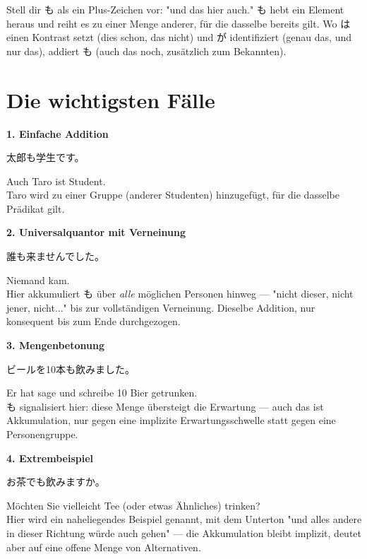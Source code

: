 \documentclass[12pt]{book}
\begin{document}
Stell dir も als ein Plus-Zeichen vor: "und das hier auch." も hebt ein Element heraus und reiht es zu einer Menge anderer, für die dasselbe bereits gilt. Wo は einen Kontrast setzt (dies schon, das nicht) und が identifiziert (genau das, und nur das), addiert も (auch das noch, zusätzlich zum Bekannten).

\section*{Die wichtigsten Fälle}

\textbf{1. Einfache Addition}
\par\quad 太郎も学生です。\\
\par\quad Auch Taro ist Student.\\

Taro wird zu einer Gruppe (anderer Studenten) hinzugefügt, für die dasselbe Prädikat gilt.

\textbf{2. Universalquantor mit Verneinung}
\par\quad 誰も来ませんでした。\\
\par\quad Niemand kam.\\

Hier akkumuliert も über \emph{alle} möglichen Personen hinweg — "nicht dieser, nicht jener, nicht..." bis zur vollständigen Verneinung. Dieselbe Addition, nur konsequent bis zum Ende durchgezogen.

\textbf{3. Mengenbetonung}
\par\quad ビールを10本も飲みました。\\
\par\quad Er hat sage und schreibe 10 Bier getrunken.\\

も signalisiert hier: diese Menge übersteigt die Erwartung — auch das ist Akkumulation, nur gegen eine implizite Erwartungsschwelle statt gegen eine Personengruppe.

\textbf{4. Extrembeispiel}
\par\quad お茶でも飲みますか。\\
\par\quad Möchten Sie vielleicht Tee (oder etwas Ähnliches) trinken?\\

Hier wird ein naheliegendes Beispiel genannt, mit dem Unterton "und alles andere in dieser Richtung würde auch gehen" — die Akkumulation bleibt implizit, deutet aber auf eine offene Menge von Alternativen.
\end{document}
